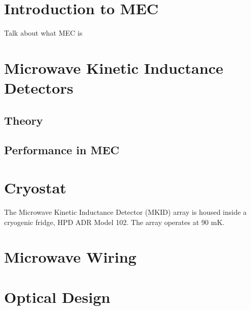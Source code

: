 \documentclass[../main.tex]{subfiles}
\begin{document}
\section{Introduction to MEC}
Talk about what MEC is

\section{Microwave Kinetic Inductance Detectors}
\subsection{Theory}
\subsection{Performance in MEC}

\section{Cryostat}
The Microwave Kinetic Inductance Detector (MKID) array is housed inside a cryogenic fridge, HPD ADR Model 102. The array operates at 90 mK.

\section{Microwave Wiring}


\section{Optical Design}
\end{document}

